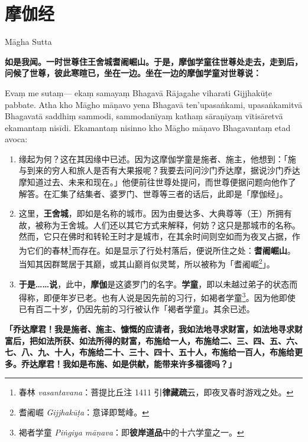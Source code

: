 \section{摩伽经}

\begin{center}Māgha Sutta\end{center}\vspace{1em}

\textbf{如是我闻。一时世尊住王舍城耆阇崛山。于是，摩伽学童往世尊处走去，走到后，问候了世尊，彼此寒暄已，坐在一边。坐在一边的摩伽学童对世尊说：}

Evaṃ me sutaṃ— ekaṃ samayaṃ Bhagavā Rājagahe viharati Gijjhakūṭe pabbate. Atha kho Māgho māṇavo yena Bhagavā ten’upasaṅkami, upasaṅkamitvā Bhagavatā saddhiṃ sammodi, sammodanīyaṃ kathaṃ sāraṇīyaṃ vītisāretvā ekamantaṃ nisīdi. Ekamantaṃ nisinno kho Māgho māṇavo Bhagavantaṃ etad avoca:

\begin{enumerate}\item 缘起为何？这在其因缘中已述。因为这摩伽学童是施者、施主，他想到：「施与到来的穷人和旅人是否有大果报呢？我要去问问沙门乔达摩，据说沙门乔达摩知道过去、未来和现在。」他便前往世尊处提问，而世尊便据问题向他作了解答。在汇集了结集者、婆罗门、世尊等三者的话后，此即是「摩伽经」。
\item 这里，\textbf{王舍城}，即如是名称的城市。因为由曼达多、大典尊等（王）所拥有故，被称为王舍城。人们还以其它方式来解释，何妨？这只是那城市的名称。然而，它只在佛时和转轮王时才是城市，在其余时间则空如而为夜叉占据，作为它们的春林\footnote{春林 \textit{vasantavana}：菩提比丘注 1411 引\textbf{律藏疏}云，即夜叉春时游戏之处。}而存在。如是显示了行处村落后，便说所住之处：\textbf{耆阇崛山}。当知其因群鹫居于其巅，或其山巅肖似灵鹫，所以被称为「耆阇崛\footnote{耆阇崛 \textit{Gijjhakūṭa}：意译即鹫峰。}」。
\item \textbf{于是……说}，此中，\textbf{摩伽}是这婆罗门的名字。\textbf{学童}，即以未越过弟子的状态而得称，即便年岁已老。也有人说是因先前的习行，如褐者学童\footnote{褐者学童 \textit{Piṅgiya māṇava}：即\textbf{彼岸道品}中的十六学童之一。}。因为他即使已有百二十岁，仍因先前的习行被认作「褐者学童」。其余已述。\end{enumerate}

\textbf{「乔达摩君！我是施者、施主、慷慨的应请者，我如法地寻求财富，如法地寻求财富后，把如法所获、如法所得的财富，布施给一人，布施给二、三、四、五、六、七、八、九、十人，布施给二十、三十、四十、五十人，布施给一百人，布施给更多。乔达摩君！我如是布施、如是供献，能带来许多福德吗？」}

